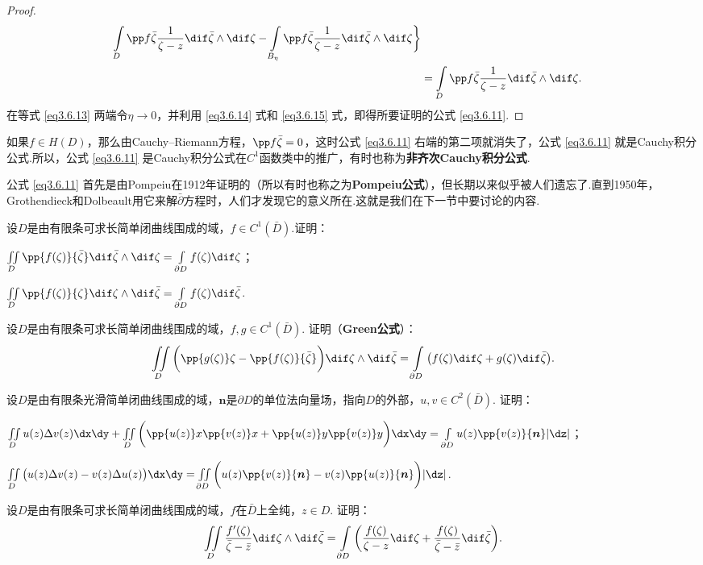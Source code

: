 \begin{proof}
\begin{equation}
\begin{aligned}
\int\limits_{D}\pp f{\bar\zeta}\frac1{\zeta-z}\dif \bar\zeta\wedge\dif \zeta-\int\limits_{B_\eta}\pp f{\bar\zeta}\frac1{\zeta-z}\dif \bar\zeta\wedge\dif \zeta\bigg\}\\
&=\int\limits_D\pp f{\bar\zeta}\frac1{\zeta-z}\dif \bar\zeta\wedge\dif \zeta.
\end{aligned}
\end{equation}
在等式 \eqref{eq3.6.13} 两端令$\eta\to0$，并利用 \eqref{eq3.6.14} 式和 \eqref{eq3.6.15} 式，即得所要证明的公式 \eqref{eq3.6.11}.
\end{proof}

如果$f\in H(D)$，那么由Cauchy--Riemann方程，$\pp f{\bar \zeta}=0$，这时公式 \eqref{eq3.6.11} 右端的第二项就消失了，公式 \eqref{eq3.6.11} 就是Cauchy积分公式.所以，公式 \eqref{eq3.6.11} 是Cauchy积分公式在$C^1$函数类中的推广，有时也称为\textbf{非齐次Cauchy积分公式}.

公式 \eqref{eq3.6.11} 首先是由Pompeiu在1912年证明的（所以有时也称之为\textbf{Pompeiu公式}），但长期以来似乎被人们遗忘了.直到1950年，Grothendieck和Dolbeault用它来解$\bar\partial$方程时，人们才发现它的意义所在.这就是我们在下一节中要讨论的内容.
\begin{xiti}
\item 设$D$是由有限条可求长简单闭曲线围成的域，$f\in C^1(\bar D)$.证明：
\begin{enuma}
  \item $\iint\limits_D\pp{f(\zeta)}{\bar\zeta}\dif \bar\zeta\wedge\dif \zeta=\int\limits_{\partial D}f(\zeta)\dif \zeta$；
  \item $\iint\limits_D\pp{f(\zeta)}{\zeta}\dif \zeta\wedge\dif \bar\zeta=\int\limits_{\partial D}f(\zeta)\dif \bar\zeta$.
\end{enuma}
\item 设$D$是由有限条可求长简单闭曲线围成的域，$f,g\in C^1(\bar D)$. 证明（\textbf{Green公式}）：
\[\iint\limits_D\bigg(\pp{g(\zeta)}\zeta-\pp{f(\zeta)}{\bar\zeta}\bigg)
\dif \zeta\wedge\dif \bar\zeta=\int\limits_{\partial D}
\big(f(\zeta)\dif \zeta+g(\zeta)\dif \bar\zeta\big).\]
\item 设$D$是由有限条光滑简单闭曲线围成的域，$\boldsymbol n$是$\partial D$的单位法向量场，指向$D$的外部，$u,v\in C^2(\bar D)$. 证明：
\begin{enuma}
  \item $\iint\limits_Du(z)\Delta v(z)\dx\dy+\iint\limits_D\bigg(
  \pp{u(z)}x\pp{v(z)}x+\pp{u(z)}y\pp{v(z)}y\bigg)\dx\dy=\int\limits_{\partial D}
  u(z)\pp{v(z)}{\boldsymbol n}|\dz|$；
  \item $\iint\limits_D\big(u(z)\Delta v(z)-v(z)\Delta u(z)\big)\dx\dy
  =\iint\limits_{\partial D}\bigg(u(z)\pp{v(z)}{\boldsymbol n}
  -v(z)\pp{u(z)}{\boldsymbol n}\bigg)|\dz|$.
\end{enuma}
\item 设$D$是由有限条可求长简单闭曲线围成的域，$f$在$\bar D$上全纯，$z\in D$. 证明：
\[\iint\limits_D\frac{f'(\zeta)}{\bar\zeta-\bar z}\dif \zeta\wedge\dif \bar\zeta
=\int\limits_{\partial D}\bigg(\frac{f(\zeta)}{\zeta-z}\dif \zeta+\frac{f(\zeta)}{\bar \zeta-\bar z}\dif \bar\zeta\bigg).\]
\end{xiti}


